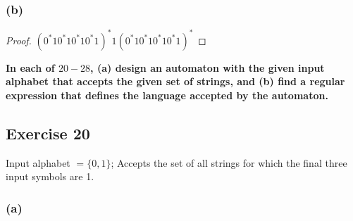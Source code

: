 \documentclass[14pt]{extarticle}
\newcommand{\cy}{\color{cyan}}
\begin{document}
\subsubsection{(b)}

\begin{proof}
\((0^*10^*10^*10^*1)^*1(0^*10^*10^*10^*1)^*\)
\end{proof}

{\bf \cy In each of \(20-28\), (a) design an automaton with the given input alphabet that accepts the given set of 
strings, and (b) find a regular expression that defines the language accepted by the automaton.}

\subsection{Exercise 20}
Input alphabet \(= \{0, 1\}\); Accepts the set of all strings for which the final three input symbols are 1.

\subsubsection{(a)}
\end{document}
